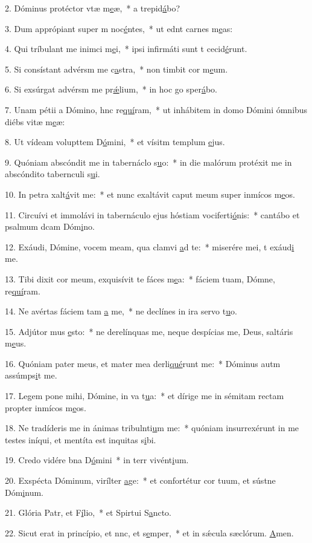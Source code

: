 2. Dóminus protéctor vtæ m\uline{e}æ,~* a  trepid\uline{á}bo?\par 
3. Dum apprópiant super m noc\uline{é}ntes,~* ut ednt carnes m\uline{e}as:\par 
4. Qui tríbulant me inimci m\uline{e}i,~* ipsi infirmáti sunt t cecid\uline{é}runt.\par 
5. Si consístant advérsm me c\uline{a}stra,~* non timbit cor m\uline{e}um.\par 
6. Si exsúrgat advérsm me pr\uline{ǽ}lium,~* in hoc go sper\uline{á}bo.\par 
7. Unam pétii a Dómino, hnc re\uline{quí}ram,~* ut inhábitem in domo Dómini ómnibus diébs vitæ m\uline{e}æ:\par 
8. Ut vídeam volupttem D\uline{ó}mini,~* et vísitm templum \uline{e}jus.\par 
9. Quóniam abscóndit me in tabernáclo s\uline{u}o:~* in die malórum protéxit me in abscóndito tabernculi s\uline{u}i.\par 
10. In petra xalt\uline{á}vit me:~* et nunc exaltávit caput meum super inmícos m\uline{e}os.\par 
11. Circuívi et immolávi in tabernáculo ejus hóstiam vociferti\uline{ó}nis:~* cantábo et psalmum dcam Dóm\uline{i}no.\par 
12. Exáudi, Dómine, vocem meam, qua clamvi \uline{a}d te:~* miserére mei, t exáud\uline{i} me.\par 
13. Tibi dixit cor meum, exquisívit te fáces m\uline{e}a:~* fáciem tuam, Dómne, re\uline{quí}ram.\par 
14. Ne avértas fáciem tam \uline{a} me,~* ne declínes in ira  servo t\uline{u}o.\par 
15. Adjútor mus \uline{e}sto:~* ne derelínquas me, neque despícias me, Deus, saltáris m\uline{e}us.\par 
16. Quóniam pater meus, et mater mea derli\uline{qué}runt me:~* Dóminus autm assúmps\uline{i}t me.\par 
17. Legem pone mihi, Dómine, in va t\uline{u}a:~* et dírige me in sémitam rectam propter inmícos m\uline{e}os.\par 
18. Ne tradíderis me in ánimas tribulnti\uline{u}m me:~* quóniam insurrexérunt in me testes iníqui, et mentíta est inquitas s\uline{i}bi.\par 
19. Credo vidére bna D\uline{ó}mini~* in terr vivént\uline{i}um.\par 
20. Exspécta Dóminum, virílter \uline{a}ge:~* et confortétur cor tuum, et sústne Dóm\uline{i}num.\par 
21. Glória Patr, et F\uline{í}lio,~* et Spirtui S\uline{a}ncto.\par 
22. Sicut erat in princípio, et nnc, et s\uline{e}mper,~* et in sǽcula sæclórum. \uline{A}men.\par 
